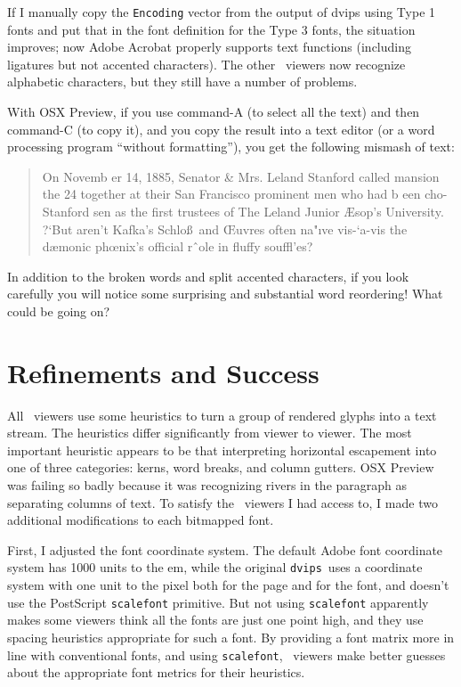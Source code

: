 \documentclass{ltugboat}
\def\PDF{\acro{PDF}}
\def\dvips{\texttt{dvips}}
\begin{document}
If I manually copy the \texttt{Encoding} vector from
the output of dvips using Type 1 fonts and put that
in the font definition for the Type 3 fonts, the situation
improves; now Adobe Acrobat properly supports text
functions (including ligatures but not accented
characters).  The other \PDF\ viewers now recognize
alphabetic characters, but they still have a number of
problems.

With OSX Preview, if you use command-A
(to select all the text) and then command-C (to copy
it), and you copy the result into a text editor (or
a word processing program ``without formatting''),
you get the following mismash of text:

\begin{quote}
\raggedright
On Novemb er 14, 1885, Senator \& Mrs. Leland
Stanford called
mansion the 24
together at their San Francisco
prominent men who had
b een cho-
Stanford
sen as the first trustees of The Leland
Junior
{\AE}sop’s
University. ?`But aren’t Kafka’s Schlo\ss\ and
{\OE}uvres often na"ıve vis-`a-vis the dæmonic
ph{\oe}nix’s official rˆole in fluffy souffl'es?
\end{quote}
\noindent
In addition to the broken words and split accented
characters, if you look carefully you will notice
some surprising
and substantial word reordering!  What could
be going on?

\section{Refinements and Success}

All \PDF\ viewers use some heuristics
to turn a group of rendered glyphs into a text stream.
The heuristics differ significantly from viewer to
viewer.  The most important heuristic appears to be
that interpreting horizontal escapement into one of
three categories: kerns, word breaks, and column
gutters.  OSX Preview was failing so badly because it
was recognizing rivers in the paragraph as separating
columns of text.
To satisfy the \PDF\ viewers I had access to,
I made two additional modifications to each bitmapped font.

First, I adjusted the font coordinate system.
The default Adobe font coordinate system has 1000 units
to the em, while the original
\dvips\ uses a coordinate system with one unit to the
pixel both for the page and for the font, and doesn't use
the PostScript \texttt{scalefont} primitive.  But not using
\texttt{scalefont} apparently makes some viewers think all the
fonts are just one point high, and they use spacing heuristics
appropriate for such a font.  By providing a font matrix
more in line with conventional fonts, and using
\texttt{scalefont}, \PDF\ viewers make better guesses about
the appropriate font metrics for their heuristics.
\end{document}

